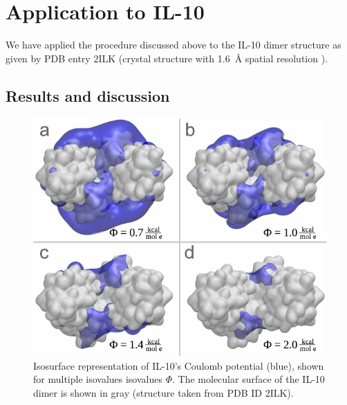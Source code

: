 

\section{Application to IL-10}

We have applied the procedure discussed above to the IL-10 dimer structure as
given by PDB entry 2ILK (crystal structure with \SI{1.6}{\angstrom} spatial
resolution \cite{Zdanov1996}).

\subsection{Results and discussion}
\label{bspred:il10}

\begin{figure}
\centering
\includegraphics[width=1.0\textwidth]{gfx/bspred/il10_top_coulomb_isosurfaces_different_values_03_ds.pdf}
\caption[]{
Isosurface representation of IL-10's Coulomb potential (blue), shown for
multiple isovalues isovalues $\Phi$. The molecular surface of the IL-10 dimer is
shown in gray (structure taken from PDB ID 2ILK).
}
\label{fig:bspred:il10_multi_iso}
\end{figure}


